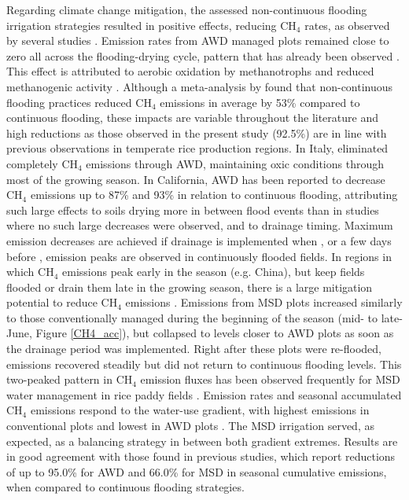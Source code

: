 Regarding climate change mitigation, the assessed non-continuous flooding irrigation strategies resulted in positive effects, reducing CH$_{4}$ rates, as observed by several studies \citep{cai2003, li2006, lahue2016, lagomarsino2016, meijide2017}. Emission rates from AWD managed plots remained close to zero all across the flooding-drying cycle, pattern that has already been observed \citep{balaine2019}. This effect is attributed to aerobic oxidation by methanotrophs and reduced methanogenic activity \citep{kumar2019alternate}. Although a meta-analysis by \cite{jiang2019} found that non-continuous flooding practices reduced CH$_{4}$ emissions in average by 53\% compared to continuous flooding, these impacts are variable throughout the literature and high reductions as those observed in the present study (92.5\%) are in line with previous observations in temperate rice production regions. In Italy, \cite{peyron2016} eliminated completely CH$_{4}$ emissions through AWD, maintaining oxic conditions through most of the growing season. In California, AWD has been reported to decrease CH$_{4}$ emissions up to 87\% \citep{lahue2016} and 93\% \citep{linquist2015} in relation to continuous flooding, attributing such large effects to soils drying more in between flood events than in studies where no such large decreases were observed, and to drainage timing. Maximum emission decreases are achieved if drainage is implemented when \citep{fertitta-roberts2019}, or a few days before \citep{souza2021}, emission peaks are observed in continuously flooded fields. In regions in which CH$_{4}$ emissions peak early in the season (e.g. China), but keep fields flooded or drain them late in the growing season, there is a large mitigation potential to reduce CH$_{4}$ emissions \citep{qian2023}. Emissions from MSD plots increased similarly to those conventionally managed during the beginning of the season (mid- to late-June, Figure \ref{CH4_acc}), but collapsed to levels closer to AWD plots as soon as the drainage period was implemented. Right after these plots were re-flooded, emissions recovered steadily but did not return to continuous flooding levels. This two-peaked pattern in CH$_{4}$ emission fluxes has been observed frequently for MSD water management in rice paddy fields \citep{sass1992, yagi1997}. Emission rates and seasonal accumulated CH$_{4}$ emissions respond to the water-use gradient, with highest emissions in conventional plots and lowest in AWD plots \citep{islam2022, perry2022}. The MSD irrigation served, as expected, as a balancing strategy in between both gradient extremes. Results are in good agreement with those found in previous studies, which report reductions of up to 95.0\% for AWD \citep{martinez-eixarch2021} and 66.0\% for MSD \citep{balaine2019} in seasonal cumulative emissions, when compared to continuous flooding strategies.\\

